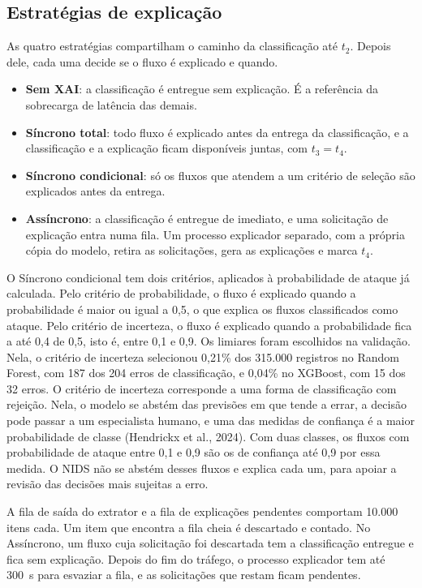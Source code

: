 \documentclass[
  article,
  12pt,
  oneside,
  a4paper,
  english,
  brazil
]{abntex2}
\begin{document}
\subsection{Estratégias de explicação}

As quatro estratégias compartilham o caminho da classificação até $t_2$. Depois dele, cada uma
decide se o fluxo é explicado e quando.
\begin{itemize}
  \item \textbf{Sem XAI}: a classificação é entregue sem explicação. É a referência da sobrecarga de
  latência das demais.
  \item \textbf{Síncrono total}: todo fluxo é explicado antes da entrega da classificação, e a
  classificação e a explicação ficam disponíveis juntas, com $t_3 = t_4$.
  \item \textbf{Síncrono condicional}: só os fluxos que atendem a um critério de seleção são
  explicados antes da entrega.
  \item \textbf{Assíncrono}: a classificação é entregue de imediato, e uma solicitação de explicação
  entra numa fila. Um processo explicador separado, com a própria cópia do modelo, retira as
  solicitações, gera as explicações e marca $t_4$.
\end{itemize}

O Síncrono condicional tem dois critérios, aplicados à probabilidade de ataque já calculada. Pelo
critério de probabilidade, o fluxo é explicado quando a probabilidade é maior ou igual a 0,5, o que
explica os fluxos classificados como ataque. Pelo critério de incerteza, o fluxo é explicado quando
a probabilidade fica a até 0,4 de 0,5, isto é, entre 0,1 e 0,9. Os limiares foram escolhidos na
validação. Nela, o critério de incerteza selecionou 0,21\% dos 315.000 registros no Random Forest,
com 187 dos 204 erros de classificação, e 0,04\% no XGBoost, com 15 dos 32 erros. O critério de
incerteza corresponde a uma forma de classificação com rejeição. Nela, o modelo se abstém das
previsões em que tende a errar, a decisão pode passar a um especialista humano, e uma das medidas de
confiança é a maior probabilidade de classe (Hendrickx et al., 2024). Com duas classes, os fluxos
com probabilidade de ataque entre 0,1 e 0,9 são os de confiança até 0,9 por essa medida. O NIDS não
se abstém desses fluxos e explica cada um, para apoiar a revisão das decisões mais sujeitas a erro.

A fila de saída do extrator e a fila de explicações pendentes comportam 10.000 itens cada. Um item
que encontra a fila cheia é descartado e contado. No Assíncrono, um fluxo cuja solicitação foi
descartada tem a classificação entregue e fica sem explicação. Depois do fim do tráfego, o processo
explicador tem até 300~s para esvaziar a fila, e as solicitações que restam ficam pendentes.
\end{document}
